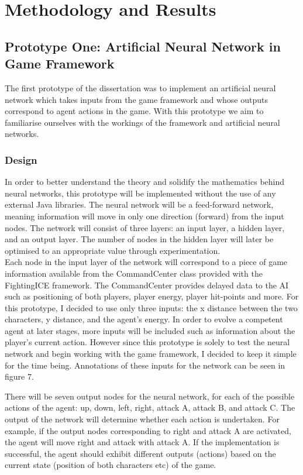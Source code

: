 \documentclass[12pt,a4paper]{article}
\begin{document}
\section{Methodology and Results}
\subsection{Prototype One: Artificial Neural Network in Game Framework}
The first prototype of the dissertation was to implement an artificial neural network which takes inputs from the game framework and whose outputs correspond to agent actions in the game. With this prototype we aim to familiarise ourselves with the workings of the framework and artificial neural networks. 
\newpage
\subsubsection{Design}
In order to better understand the theory and solidify the mathematics behind neural networks, this prototype will be implemented without the use of any external Java libraries. The neural network will be a feed-forward network, meaning information will move in only one direction (forward) from the input nodes. The network will consist of three layers: an input layer, a hidden layer, and an output layer. The number of nodes in the hidden layer will later be optimised to an appropriate value through experimentation.\\

Each node in the input layer of the network will correspond to a piece of game information available from the CommandCenter class provided with the FightingICE framework. The CommandCenter provides delayed data to the AI such as positioning of both players, player energy, player hit-points and more. For this prototype, I decided to use only three inputs: the x distance between the two characters, y distance, and the agent's energy. In order to evolve a competent agent at later stages, more inputs will be included such as information about the player's current action. However since this prototype is solely to test the neural network and begin working with the game framework, I decided to keep it simple for the time being. Annotations of these inputs for the network can be seen in figure 7.\\

\begin{figure}[h]
\end{figure}
\newpage
There will be seven output nodes for the neural network, for each of the possible actions of the agent: up, down, left, right, attack A, attack B, and attack C. The output of the network will determine whether each action is undertaken. For example, if the output nodes corresponding to right and attack A are activated, the agent will move right and attack with attack A. If the implementation is successful, the agent should exhibit different outputs (actions) based on the current state (position of both characters etc) of the game.
\newpage
\end{document}
